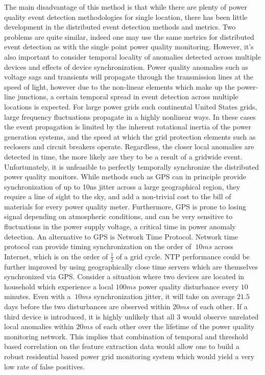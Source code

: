 The main disadvantage of this method is that while there are plenty of power quality event detection methodologies for single location, there has been little development in the distributed event detection methods and metrics.
Two problems are quite similar, indeed one may use the same metrics for distributed event detection as with the single point power quality monitoring.
However, it's also important to consider temporal locality of anomalies detected across multiple devices and effects of device synchronization.
Power quality anomalies such as voltage sags and transients will propagate through the transmission lines at the speed of light, however due to the non-linear elements which make up the power-line junctions, a certain temporal spread in event detection across multiple locations is expected.
For large power grids such continental United States grids, large frequency fluctuations propagate in a highly nonlinear ways.
In these cases the event propagation is limited by the inherent rotational inertia of the power generation systems, and the speed at which the grid protection elements such as reclosers and circuit breakers operate.
Regardless, the closer local anomalies are detected in time, the more likely are they to be a result of a gridwide event.
Unfortunately, it is unfeasible to perfectly temporally synchronize the distributed power quality monitors.
While methods such as GPS can in principle provide synchronization of up to 10ns jitter across a large geographical region, they require a line of sight to the sky, and add a non-trivial cost to the bill of materials for every power quality meter.
Furthermore, GPS is prone to losing signal depending on atmospheric conditions, and can be very sensitive to fluctuations in the power supply voltage, a critical time in power anomaly detection.
An alternative to GPS is Network Time Protocol.
Network time protocol can provide timing synchronization on the order of $~10ms$ across Internet, which is on the order of $\frac{1}{2}$ of a grid cycle.
NTP performance could be further improved by using geographically close time servers which are themselves synchronized via GPS. Consider a situation where two devices are located in household which experience a local $100ms$ power quality disturbance every $10$ minutes.
Even with a $~10ms$ synchronization jitter, it will take on average $21.5$ days before the two disturbances are observed within $20ms$ of each other.
If a third device is introduced, it is highly unlikely that all 3 would observe unrelated local anomalies within $20ms$ of each other over the lifetime of the power quality monitoring network.
This implies that combination of temporal and threshold based correlation on the feature extraction data would allow one to build a robust residential based power grid monitoring system which would yield a very low rate of false positives.

